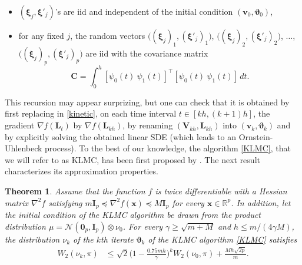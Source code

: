 \documentclass[a4paper,bej,preprint,reqno]{imsart}
\newcommand\bL{\boldsymbol L}
\newcommand\bV{\boldsymbol V}
\newcommand\bx{\boldsymbol x}
\newcommand\bv{\boldsymbol v}
\newcommand\bxi{\boldsymbol \xi}
\newcommand\RR{\mathbb R}
\newcommand\bfI{\mathbf I}
\newcommand\bvartheta{\boldsymbol\vartheta}
\newtheorem{theorem}{Theorem}
\begin{document}
\begin{itemize}\itemsep=0pt
\item $(\bxi_j,\bxi'_j)$'s are iid and independent of the initial condition $(\bv_0,\bvartheta_0)$,
\item for any fixed $j$, the random vectors $\big((\bxi_{j})_1,(\bxi'_j)_1\big)$,
$\big((\bxi_{j})_2,(\bxi'_j)_2\big)$, $\ldots$, $\big((\bxi_{j})_p,(\bxi'_j)_p\big)$
are iid with the covariance matrix
$$
\mathbf C = \int_0^h [\psi_0(t) \ \psi_1(t)]^\top [\psi_0(t) \ \psi_1(t)]\,
dt.
$$
\end{itemize}
\vspace{-8pt}

This recursion may appear surprizing, but one can check that it is obtained
by first replacing in \eqref{kinetic}, on each time interval $t\in[kh,(k+1)h]$,
the gradient $\nabla f(\bL_t)$ by $\nabla f(\bL_{kh})$, by renaming $(\bV_{kh},\bL_{kh})$
into $(\bv_k,\bvartheta_k)$ and by explicitly solving the obtained linear SDE (which leads to an 
Ornstein-Uhlenbeck process). To the best of our knowledge, the algorithm \eqref{KLMC}, that 
we will refer to as KLMC, has been first proposed by \cite{Cheng2}. The next result 
characterizes its approximation properties.


\begin{theorem}\label{th:3}
Assume that the function $f$ is twice differentiable with a Hessian matrix
$\nabla^2f$ satisfying $m\bfI_p\preceq \nabla^2f(\bx)\preceq M\bfI_p$ for every
$\bx\in\RR^p$.
In addition, let the initial condition of the KLMC algorithm be drawn from the product
distribution $\mu = \mathcal N(\mathbf 0_p,\bfI_p)\otimes \nu_0$.  For every $\gamma\ge
\sqrt{m+M}$ and $h\le m/(4\gamma M)$, the distribution $\nu_k$ of the $k$th iterate
$\bvartheta_k$ of the KLMC algorithm \eqref{KLMC} satisfies
\begin{align}
W_2(\nu_k,\pi)
&\le \sqrt{2}\Big(1-\frac{0.75mh}{\gamma}\Big)^kW_2(\nu_0,\pi) +
\frac{Mh\sqrt{2p}}{m}.
\end{align}
\end{theorem}
\end{document}
